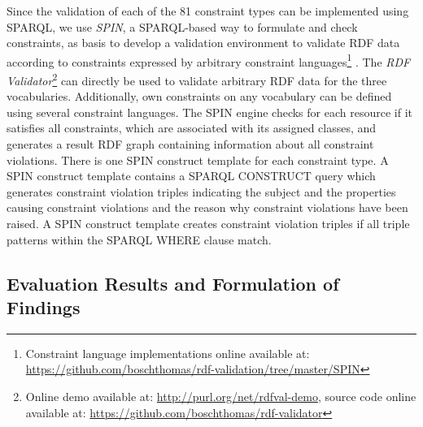 \documentclass[conference]{IEEEtran}
\begin{document}
Since the validation of each of the 81 constraint types can be implemented using SPARQL, we use \emph{SPIN}, a SPARQL-based way to formulate and check constraints, as basis to develop a
validation environment to validate RDF data according to constraints expressed by arbitrary constraint languages\footnote{Constraint language implementations online available at: \url{https://github.com/boschthomas/rdf-validation/tree/master/SPIN}} \cite{BoschEckert2014-2}.
The \emph{RDF Validator}\footnote{Online demo available at: \url{http://purl.org/net/rdfval-demo}, source code online available at: \url{https://github.com/boschthomas/rdf-validator}} can directly be used to validate arbitrary RDF data for the three vocabularies. Additionally, own constraints on any vocabulary can be defined using several constraint languages.
The SPIN engine checks for each resource if it satisfies all constraints, which are associated with its assigned classes, and generates a result RDF graph containing information about all constraint violations.
There is one SPIN construct template for each constraint type.
A SPIN construct template contains a SPARQL CONSTRUCT query which generates constraint violation triples indicating the subject and the properties causing constraint violations and the reason why constraint violations have been raised.
A SPIN construct template creates constraint violation triples if all triple patterns within the SPARQL WHERE clause match.

\subsection{Evaluation Results and Formulation of Findings}

\end{document}
